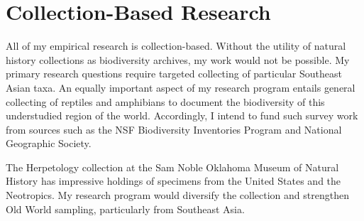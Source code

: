 \documentclass[10pt]{article}
\begin{document}
\section*{Collection-Based Research}
All of my empirical research is collection-based.
Without the utility of natural history collections as biodiversity archives,
my work would not be possible.
My primary research questions require targeted collecting of particular
Southeast Asian taxa.
An equally important aspect of my research program entails general 
collecting of reptiles and amphibians to document the biodiversity of
this understudied region of the world.
Accordingly, I intend to fund such survey work
from sources such as the  NSF Biodiversity Inventories
Program and National Geographic Society.

The Herpetology collection at the Sam Noble Oklahoma Museum of Natural History
has impressive holdings of specimens from the United States and the Neotropics.
My research program would diversify the collection and strengthen Old World
sampling, particularly from Southeast Asia.
\end{document}
